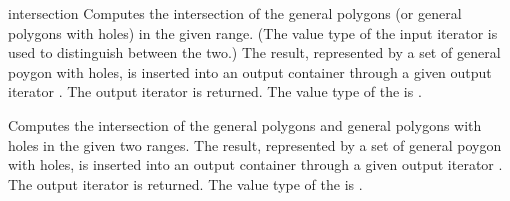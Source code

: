 \begin{ccRefFunction}{intersection}
{Computes the intersection of the general polygons (or general polygons with
holes) in the given range. (The value type of the input iterator is
used to distinguish between the two.) The result, represented by a set
of general poygon with holes, is inserted into an output container
through a given output iterator . The output iterator is
returned. The value type of the  is
.}

{Computes the intersection of the general polygons and general polygons
with holes in the given two ranges. The result, represented by a set
of general poygon with holes, is inserted into an output container
through a given output iterator . The output iterator is
returned. The value type of the  is
.}

\ccSeeAlso
{}\\
\\
\\

\end{ccRefFunction}
